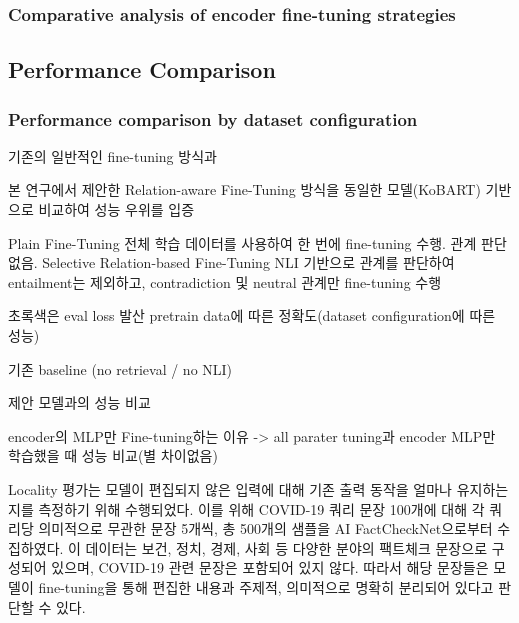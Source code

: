 \documentclass[a4paper,fleqn]{cas-sc}
\begin{document}
\subsubsection{Comparative analysis of encoder fine-tuning strategies}

\subsection{Performance Comparison}
\subsubsection{Performance comparison by dataset configuration}

기존의 일반적인 fine-tuning 방식과

본 연구에서 제안한 Relation-aware Fine-Tuning 방식을 동일한 모델(KoBART) 기반으로 비교하여 성능 우위를 입증

Plain Fine-Tuning	전체 학습 데이터를 사용하여 한 번에 fine-tuning 수행. 관계 판단 없음.
Selective Relation-based Fine-Tuning	NLI 기반으로 관계를 판단하여 entailment는 제외하고, contradiction 및 neutral 관계만 fine-tuning 수행

\begin{table}[htbp]
    \centering
    \caption{Dataset configurations for transfer learning.}
    \end{table}
    
초록색은 eval loss 발산
pretrain data에 따른 정확도(dataset configuration에 따른 성능)


기존 baseline (no retrieval / no NLI)

제안 모델과의 성능 비교


encoder의 MLP만 Fine-tuning하는 이유 -> all parater tuning과 encoder MLP만 학습했을 때 성능 비교(별 차이없음)

Locality 평가는 모델이 편집되지 않은 입력에 대해 기존 출력 동작을 얼마나 유지하는지를 측정하기 위해 수행되었다. 이를 위해 COVID-19 쿼리 문장 100개에 대해 각 쿼리당 의미적으로 무관한 문장 5개씩, 총 500개의 샘플을 AI FactCheckNet으로부터 수집하였다. 이 데이터는 보건, 정치, 경제, 사회 등 다양한 분야의 팩트체크 문장으로 구성되어 있으며, COVID-19 관련 문장은 포함되어 있지 않다. 따라서 해당 문장들은 모델이 fine-tuning을 통해 편집한 내용과 주제적, 의미적으로 명확히 분리되어 있다고 판단할 수 있다.
\end{document}
